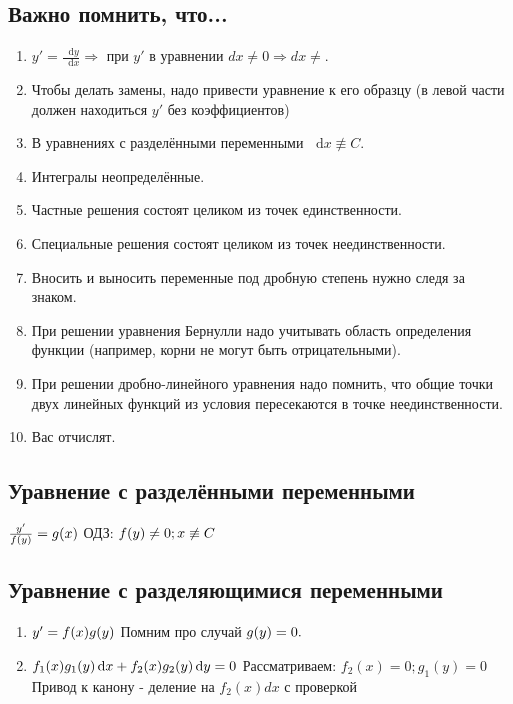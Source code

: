 \documentclass[12pt]{article}
\newcommand*\diff{\mathop{}\!\mathrm{d}}
\begin{document}
\subsection{Важно помнить, что...}
\begin{enumerate}
\item $y' = \frac{\diff y}{\diff x} \Rightarrow $ при $y'$ в уравнении $dx \neq 0 \Rightarrow dx \neq$.
\item Чтобы делать замены, надо привести уравнение к его образцу (в левой части должен находиться $y'$ без коэффициентов) 
\item В уравнениях с разделёнными переменными $\diff x \not\equiv C$.
\item Интегралы неопределённые.
\item Частные решения состоят целиком из точек единственности.
\item Специальные решения состоят целиком из точек неединственности.
\item Вносить и выносить переменные под дробную степень нужно следя за знаком.
\item При решении уравнения Бернулли надо учитывать область определения функции (например, корни не могут быть отрицательными).
\item При решении дробно-линейного уравнения надо помнить, что общие точки двух линейных функций из условия пересекаются в точке неединственности.
\item Вас отчислят.
\end{enumerate}

\subsection{Уравнение с разделёнными переменными}
$\frac{y'}{f(y)} = g(x) \\$
ОДЗ: $f(y) \neq 0; x \not\equiv C\\$
\subsection{Уравнение с разделяющимися переменными}

\begin{enumerate}
\item $y' = f(x)g(y) \\ $
Помним про случай $g(y) = 0 .\\$ 
\item $f_1(x)g_1(y) \diff x + f_2(x) g_2(y) \diff y = 0 \\$
Рассматриваем: $f_2(x) = 0;g_1(y) = 0$
Привод к канону - деление на $f_2(x)dx$ с проверкой
\end{enumerate}
\end{document}
